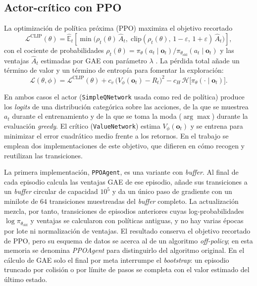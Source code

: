 \subsection{Actor-crítico con PPO}\label{sec:ppo}
La optimización de política próxima (PPO) maximiza el objetivo recortado
\citep{schulman2017proximal}
\begin{equation}
    \mathcal{L}^{\text{CLIP}}(\theta) =
    \hat{\mathbb{E}}_t\!\left[\min\!\big(\rho_t(\theta)\,\hat{A}_t,\;
    \mathrm{clip}(\rho_t(\theta),\,1-\varepsilon,\,1+\varepsilon)\,\hat{A}_t\big)\right],
\end{equation}
con el cociente de probabilidades
$\rho_t(\theta) = \pi_\theta(a_t\mid \mathbf{o}_t) / \pi_{\theta_{\text{old}}}(a_t\mid \mathbf{o}_t)$
y las ventajas $\hat{A}_t$ estimadas por GAE con parámetro $\lambda$
\citep{schulman2016high}. La pérdida total añade un
término de valor y un término de entropía para fomentar la exploración:
\begin{equation}
    \mathcal{L}(\theta,\phi) = \mathcal{L}^{\text{CLIP}}(\theta)
    + c_v\, \big(V_\phi(\mathbf{o}_t) - R_t\big)^2
    - c_H\, \mathcal{H}\!\big[\pi_\theta(\cdot\mid\mathbf{o}_t)\big].
\end{equation}

En ambos casos el actor (\texttt{SimpleQNetwork} usada como red de
política) produce los \textit{logits} de una distribución categórica
sobre las acciones, de la que se muestrea $a_t$ durante el entrenamiento
y de la que se toma la moda ($\arg\max$) durante la evaluación
\textit{greedy}. El crítico (\texttt{ValueNetwork}) estima
$V_\phi(\mathbf{o}_t)$ y se entrena para minimizar el error cuadrático
medio frente a los retornos. En el trabajo se emplean dos
implementaciones de este objetivo, que difieren en cómo recogen y
reutilizan las transiciones.

La primera implementación, \texttt{PPOAgent}, es una variante con
\textit{buffer}. Al final de cada episodio calcula las ventajas GAE de ese
episodio, añade sus
transiciones a un \textit{buffer} circular de capacidad $10^5$ y da un
único paso de gradiente con un minilote de $64$ transiciones muestreadas
del \textit{buffer} completo. La actualización mezcla, por tanto,
transiciones de episodios anteriores cuyas log-probabilidades
$\log\pi_{\theta_{\text{old}}}$ y ventajas se calcularon con políticas
antiguas, y no hay varias épocas por lote ni normalización de ventajas.
El resultado conserva el objetivo recortado de PPO, pero su esquema de
datos se acerca al de un algoritmo \textit{off-policy}; en esta memoria
se denomina \textit{PPOAgent} para distinguirlo del algoritmo original.
En el cálculo de GAE solo el final por meta interrumpe el
\textit{bootstrap}: un episodio truncado por colisión o por límite de
pasos se completa con el valor estimado del último estado.

